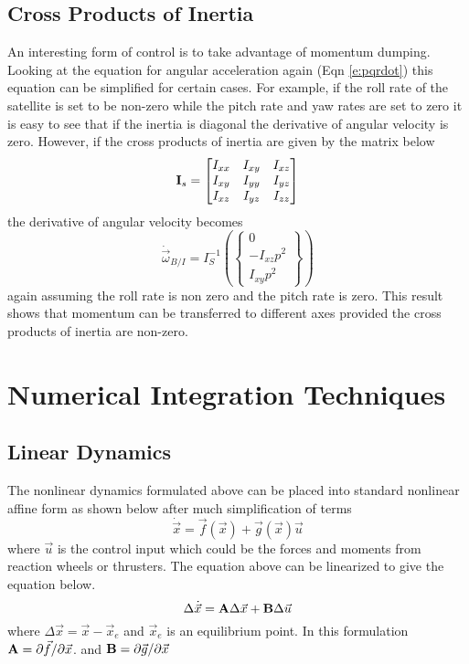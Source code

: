 \documentclass{article}
\begin{document}
\subsection{Cross Products of Inertia}

An interesting form of control is to take advantage of momentum
dumping. Looking at the equation for angular acceleration again (Eqn \ref{e:pqrdot}) this
equation can be simplified for certain cases. For example, if the roll
rate of the satellite is set to be non-zero while the pitch rate and
yaw rates are set to zero it is easy to see that if the inertia is
diagonal the derivative of angular velocity is zero. However, if the
cross products of inertia are given by the matrix below
\begin{equation}
  {\bf I}_s = \begin{bmatrix} I_{xx} & I_{xy} & I_{xz} \\ I_{xy} &
    I_{yy} & I_{yz} \\ I_{xz} & I_{yz} & I_{zz} \end{bmatrix}
\end{equation}
the derivative of angular velocity becomes
\begin{equation}
  \dot{\vec{\omega}}_{B/I} = I_S^{-1} \left (\begin{Bmatrix} 0
    \\ -I_{xz}p^2 \\ I_{xy}p^2 \end{Bmatrix} \right )
\end{equation}
again assuming the roll rate is non zero and the pitch rate is
zero. This result shows that momentum can be transferred to different
axes provided the cross products of inertia are non-zero. 

\section{Numerical Integration Techniques}

\subsection{Linear Dynamics}

The nonlinear dynamics formulated above can be placed into standard
nonlinear affine form as shown below after much simplification of
terms
\begin{equation}
  \dot{\vec{x}} = \vec{f}(\vec{x}) + \vec{g}(\vec{x})\vec{u}
\end{equation}
where $\vec{u}$ is the control input which could be the forces and
moments from reaction wheels or thrusters. The equation above can be
linearized to give the equation below. 
\begin{equation}
  \Delta \dot{\vec{x}} = {\bf A}\Delta {\vec{x}} + {\bf B}\Delta \vec{u}
\end{equation}
where $\Delta \vec{x} = \vec{x} - \vec{x}_e$ and $\vec{x}_e$ is an
equilibrium point. In this formulation ${\bf A} = \partial \vec{f}/\partial \vec{x}$. and 
${\bf B} = \partial \vec{g}/\partial \vec{x}$
\end{document}
